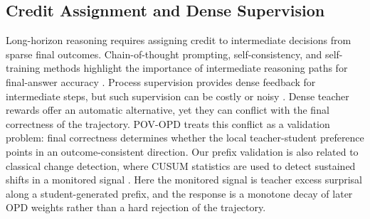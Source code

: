 \subsection{Credit Assignment and Dense Supervision}

Long-horizon reasoning requires assigning credit to intermediate decisions from sparse final outcomes. Chain-of-thought prompting, self-consistency, and self-training methods highlight the importance of intermediate reasoning paths for final-answer accuracy \cite{wei2022chain,wang2022selfconsistency,zelikman2022star}. Process supervision provides dense feedback for intermediate steps, but such supervision can be costly or noisy \cite{lightman2023lets}. Dense teacher rewards offer an automatic alternative, yet they can conflict with the final correctness of the trajectory. POV-OPD treats this conflict as a validation problem: final correctness determines whether the local teacher-student preference points in an outcome-consistent direction. Our prefix validation is also related to classical change detection, where CUSUM statistics are used to detect sustained shifts in a monitored signal \cite{page1954continuous,basseville1993detection}. Here the monitored signal is teacher excess surprisal along a student-generated prefix, and the response is a monotone decay of later OPD weights rather than a hard rejection of the trajectory.
